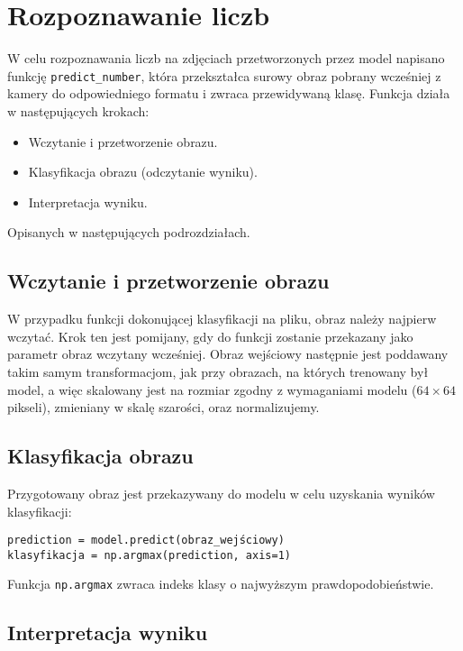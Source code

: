 \section{Rozpoznawanie liczb}\label{sec:funkcja-predict}

W celu rozpoznawania liczb na zdjęciach przetworzonych przez model napisano funkcję \texttt{predict\_number},
która przekształca surowy obraz pobrany wcześniej z kamery do odpowiedniego formatu i zwraca przewidywaną klasę.
Funkcja działa w następujących krokach:
\begin{itemize}
    \item Wczytanie i przetworzenie obrazu.
    \item Klasyfikacja obrazu (odczytanie wyniku).
    \item Interpretacja wyniku.
\end{itemize}
Opisanych w następujących podrozdziałach.

\subsection{Wczytanie i przetworzenie obrazu}\label{subsec:wczytanie-i-przetworzenie-obrazu}

W przypadku funkcji dokonującej klasyfikacji na pliku, obraz należy najpierw wczytać.
Krok ten jest pomijany, gdy do funkcji zostanie przekazany jako parametr obraz wczytany wcześniej.
Obraz wejściowy następnie jest poddawany takim samym transformacjom, jak przy obrazach, na których trenowany był model,
a więc skalowany jest na rozmiar zgodny z wymaganiami modelu ($64 \times 64$ pikseli), zmieniany w skalę szarości, oraz normalizujemy.

\subsection{Klasyfikacja obrazu}\label{subsec:klasyfikacja-obrazu}

Przygotowany obraz jest przekazywany do modelu w celu uzyskania wyników klasyfikacji:

\begin{verbatim}
prediction = model.predict(obraz_wejściowy)
klasyfikacja = np.argmax(prediction, axis=1)
\end{verbatim}

Funkcja \texttt{np.argmax} zwraca indeks klasy o najwyższym prawdopodobieństwie.

\subsection{Interpretacja wyniku}\label{subsec:interpretacja-wyniku}

